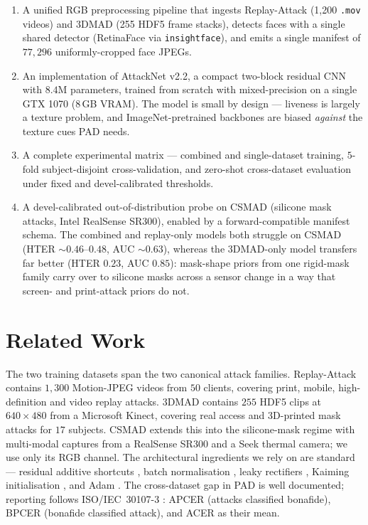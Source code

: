 \documentclass[anonymous, manuscript, screen, review]{acmart}
\begin{document}
\begin{enumerate}[leftmargin=*,topsep=2pt,itemsep=2pt]
\item A unified RGB preprocessing pipeline that ingests Replay-Attack
   (1{,}200 \texttt{.mov} videos) and 3DMAD 
   (255 HDF5 frame stacks),
   detects faces with a single shared detector (RetinaFace via
   \texttt{insightface}), and emits a single manifest of
   $77{,}296$ uniformly-cropped face JPEGs.

\item An implementation of AttackNet v2.2, a compact two-block residual
   CNN with $8.4$M parameters, trained from scratch with mixed-precision
   on a single GTX 1070 (8\,GB VRAM). The model is small by design ---
   liveness is largely a texture problem, and ImageNet-pretrained
   backbones are biased \emph{against} the texture cues PAD needs.

\item A complete experimental matrix --- combined and single-dataset
   training, $5$-fold subject-disjoint cross-validation, and zero-shot
   cross-dataset evaluation under fixed and devel-calibrated thresholds.

\item A devel-calibrated out-of-distribution probe on CSMAD (silicone
   mask attacks, Intel RealSense SR300), enabled by a forward-compatible
   manifest schema. The combined and replay-only models both struggle
   on CSMAD (HTER ${\sim}0{.}46$--$0{.}48$, AUC ${\sim}0{.}63$), whereas
   the 3DMAD-only model transfers far better (HTER $0{.}23$, AUC
   $0{.}85$): mask-shape priors from one rigid-mask family carry over to
   silicone masks across a sensor change in a way that screen- and
   print-attack priors do not.
\end{enumerate}

\section{Related Work}
\label{sec:related}

The two training datasets span the two canonical attack families.
Replay-Attack \cite{anjos2011replay} contains $1{,}300$ Motion-JPEG
videos from $50$ clients, covering print, mobile, high-definition
and video replay attacks. 3DMAD \cite{erdogmus20143dmad} contains
$255$ HDF5 clips at $640{\times}480$ from a Microsoft Kinect, covering
real access and 3D-printed mask attacks for $17$ subjects. CSMAD
\cite{bhattacharjee2018csmad} extends this into the silicone-mask
regime with multi-modal captures from a RealSense SR300 and a Seek
thermal camera; we use only its RGB channel. The architectural
ingredients we rely on are standard --- residual additive shortcuts
\cite{he2016resnet}, batch normalisation \cite{ioffe2015batchnorm},
leaky rectifiers \cite{maas2013leaky}, Kaiming initialisation
\cite{he2015kaiming}, and Adam \cite{kingma2014adam}. The cross-dataset
gap in PAD is well documented; reporting follows ISO/IEC~30107-3
\cite{iso301073}: APCER (attacks classified bonafide), BPCER (bonafide
classified attack), and ACER as their mean.
\end{document}
